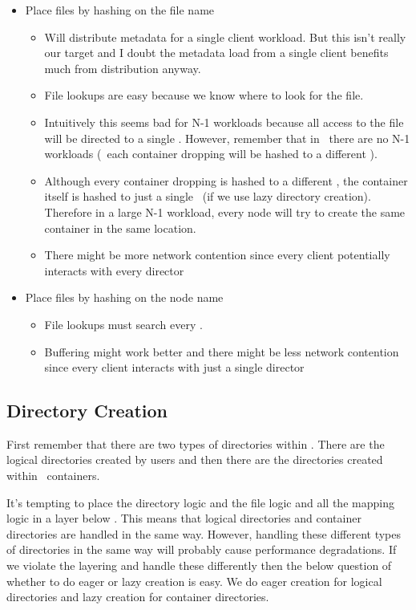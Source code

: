 \documentclass[10pt]{article}
\begin{document}
\begin{itemize}
\item{Place files by hashing on the file name}
\begin{itemize}
\item{Will distribute metadata for
a single client workload.  But this isn't really our target and I doubt the
metadata load from a single client benefits much from distribution anyway.
}
\item{File lookups are easy because we know where to look for the file.}
\item{Intuitively this seems bad for N-1 workloads because all access to the
file will be directed to a single \store.  However, remember that in \plfs\
there are no N-1 workloads (\ie\ each container dropping will be hashed to
a different \store).}
\item{Although every container dropping is hashed to a different \store, the
container itself is hashed to just a single \store\
(if we use lazy directory creation).  Therefore in a large N-1 workload,
every node will try to create the same container in the same location.}
\item{There might be more network contention since every client potentially
interacts with every director}
\end{itemize}
\item{Place files by hashing on the node name}
\begin{itemize}
\item{File lookups must search every \store.} 
\item{Buffering might work better and there might be less network contention
since every client interacts with just a single director} 
\end{itemize}
\end{itemize}

\subsection{Directory Creation}
\label{sec-dir}

First remember that there are two types of directories within \plfs.  There are
the logical directories created by users and then there are the directories
created within \plfs\ containers.  


It's tempting to place the directory logic and the file logic and all the
mapping logic in a layer below \plfs.  This means that logical directories
and container directories are handled in the same way.  However, handling
these different types of directories in the same way will probably cause
performance degradations.  If we violate the layering and handle these
differently then the below question of whether to do eager or lazy creation
is easy.  We do eager creation for logical directories and lazy creation
for container directories.
\end{document}
